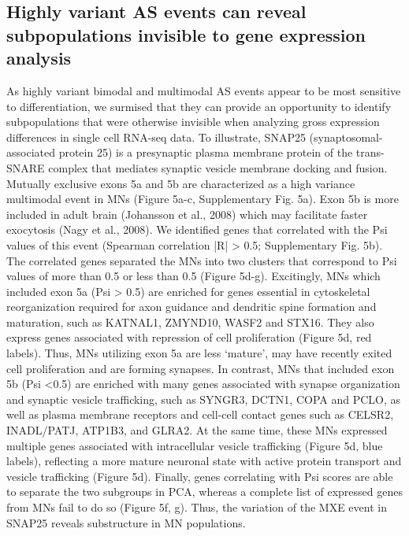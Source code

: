 \subsection{Highly variant AS events can reveal subpopulations invisible to gene expression analysis}

As highly variant bimodal and multimodal AS events appear to be most sensitive to differentiation, we surmised that they can provide an opportunity to identify subpopulations that were otherwise invisible when analyzing gross expression differences in single cell RNA-seq data. To illustrate, SNAP25 (synaptosomal-associated protein 25) is a presynaptic plasma membrane protein of the trans-SNARE complex that mediates synaptic vesicle membrane docking and fusion. Mutually exclusive exons 5a and 5b are characterized as a high variance multimodal event in MNs (Figure 5a-c, Supplementary Fig. 5a). Exon 5b is more included in adult brain (Johansson et al., 2008) which may facilitate faster exocytosis (Nagy et al., 2008). We identified genes that correlated with the Psi values of this event (Spearman correlation |R| > 0.5; Supplementary Fig. 5b). The correlated genes separated the MNs into two clusters that correspond to Psi values of more than 0.5 or less than 0.5 (Figure 5d-g). Excitingly, MNs which included exon 5a (Psi > 0.5) are enriched for genes essential in cytoskeletal reorganization required for axon guidance and dendritic spine formation and maturation, such as KATNAL1, ZMYND10, WASF2 and STX16. They also express genes associated with repression of cell proliferation (Figure 5d, red labels). Thus, MNs utilizing exon 5a are less ‘mature’, may have recently exited cell proliferation and are forming synapses. In contrast, MNs that included exon 5b (Psi <0.5) are enriched with many genes associated with synapse organization and synaptic vesicle trafficking, such as SYNGR3, DCTN1, COPA and PCLO, as well as plasma membrane receptors and cell-cell contact genes such as CELSR2, INADL/PATJ, ATP1B3, and GLRA2. At the same time, these MNs expressed multiple genes associated with intracellular vesicle trafficking (Figure 5d, blue labels), reflecting a more mature neuronal state with active protein transport and vesicle trafficking (Figure 5d). Finally, genes correlating with Psi scores are able to separate the two subgroups in PCA, whereas a complete list of expressed genes from MNs fail to do so (Figure 5f, g). Thus, the variation of the MXE event in SNAP25 reveals substructure in MN populations.

